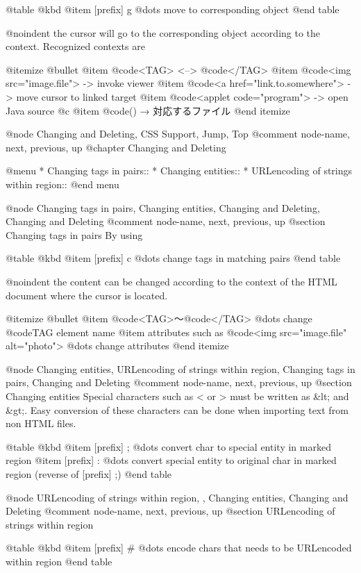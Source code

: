 @table @kbd
@item [prefix] g
        @dots{} move to corresponding object
@end table

@noindent 
the cursor will go to the corresponding object according to the context.
Recognized contexts are

@itemize @bullet
@item @code{<TAG>} <--> @code{</TAG>}
@item @code{<img src="image.file">} -> invoke viewer
@item @code{<a href="link.to.somewhere">} -> move cursor to linked target
@item @code{<applet code="program">} -> open Java source
@c @item @code{()} → 対応するファイル
@end itemize

@node Changing and Deleting, CSS Support, Jump, Top
@comment  node-name,  next,  previous,  up
@chapter Changing and Deleting

@menu
* Changing tags in pairs::      
* Changing entities::           
* URLencoding of strings within region::  
@end menu

@node Changing tags in pairs, Changing entities, Changing and Deleting, Changing and Deleting
@comment  node-name,  next,  previous,  up
@section Changing tags in pairs
By using

@table @kbd
@item [prefix] c
        @dots{} change tags in matching pairs
@end table

@noindent 
the content can be changed according to the context of the HTML document
where the cursor is located.

@itemize @bullet
@item @code{<TAG>}〜@code{</TAG>}
@dots{} change @code{TAG} element name
@item attributes such as @code{<img src="image.file" alt="photo">}
@dots{} change attributes
@end itemize

@node Changing entities, URLencoding of strings within region, Changing tags in pairs, Changing and Deleting
@comment  node-name,  next,  previous,  up
@section Changing entities
Special characters such as < or > must be written as &lt; and &gt;.  Easy
conversion of these characters can be done when importing text from non
HTML files.


@table @kbd
@item [prefix] ;
        @dots{} convert char to special entity in marked region
@item [prefix] :
        @dots{} convert special entity to original char in marked region
        (reverse of [prefix] ;)
@end table


@node URLencoding of strings within region,  , Changing entities, Changing and Deleting
@comment  node-name,  next,  previous,  up
@section URLencoding of strings within region

@table @kbd
@item [prefix] #
	@dots{} encode chars that needs to be URLencoded within region
@end table

